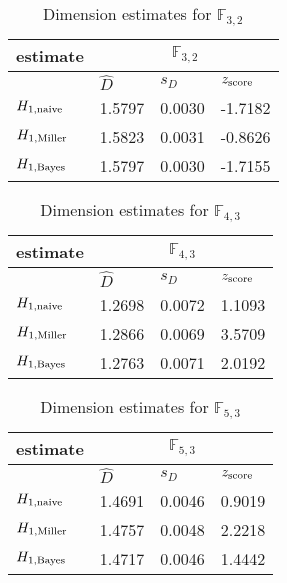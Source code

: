 \begin{table}[H] 
\begin{center}
\caption{Dimension estimates for $\mathbb{F}_{3,2}$}
\label{tab:est1s}
\begin{tabular}{|l|l|l|l|}
\hline
 estimate & \multicolumn{3}{c|}{$\mathbb{F}_{3,2}$} \\
\hline
 & $\hat{D}$ & $s_{D}$ & $z_{\mbox{\scriptsize{score}}}$ \\
\hline
$ H_{1,\mbox{\scriptsize{naive}}} $ & 1.5797 & 0.0030 & -1.7182 \\ 
\hline 
$ H_{1,\mbox{\scriptsize{Miller}}} $ & 1.5823 & 0.0031 & -0.8626 \\ 
\hline 
$ H_{1,\mbox{\scriptsize{Bayes}}} $ & 1.5797 & 0.0030 & -1.7155 \\ 
\hline 
\end{tabular}
\end{center}
\end{table}

\begin{table}[H] 
\begin{center}
\caption{Dimension estimates for $\mathbb{F}_{4,3}$}
\label{tab:est2s}
\begin{tabular}{|l|l|l|l|}
\hline
 estimate & \multicolumn{3}{c|}{$\mathbb{F}_{4,3}$} \\
\hline
 & $\hat{D}$ & $s_{D}$ & $z_{\mbox{\scriptsize{score}}}$ \\
\hline 
$ H_{1,\mbox{\scriptsize{naive}}} $ & 1.2698 & 0.0072 & 1.1093 \\ 
\hline 
$ H_{1,\mbox{\scriptsize{Miller}}} $ & 1.2866 & 0.0069 & 3.5709 \\ 
\hline 
$ H_{1,\mbox{\scriptsize{Bayes}}} $ & 1.2763 & 0.0071 & 2.0192 \\ 
\hline 
\end{tabular}
\end{center}
\end{table}

\begin{table}[H] 
\begin{center}
\caption{Dimension estimates for $\mathbb{F}_{5,3}$}
\label{tab:est3s}
\begin{tabular}{|l|l|l|l|}
\hline
 estimate & \multicolumn{3}{c|}{$\mathbb{F}_{5,3}$} \\
\hline
 & $\hat{D}$ & $s_{D}$ & $z_{\mbox{\scriptsize{score}}}$ \\
\hline 
$ H_{1,\mbox{\scriptsize{naive}}} $ & 1.4691 & 0.0046 & 0.9019 \\ 
\hline 
$ H_{1,\mbox{\scriptsize{Miller}}} $ & 1.4757 & 0.0048 & 2.2218 \\ 
\hline 
$ H_{1,\mbox{\scriptsize{Bayes}}} $ & 1.4717 & 0.0046 & 1.4442 \\ 
\hline 
\end{tabular}
\end{center}
\end{table}

